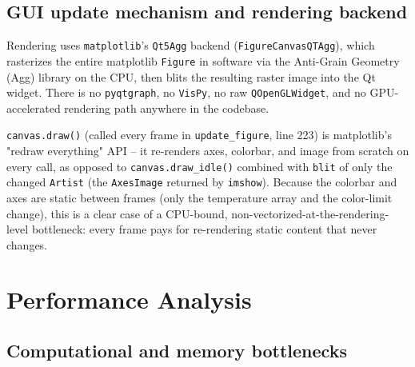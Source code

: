 \documentclass[11pt,a4paper]{report}
\begin{document}
\section{GUI update mechanism and rendering backend}

\begin{factbox}
Rendering uses \texttt{matplotlib}'s \texttt{Qt5Agg} backend (\texttt{FigureCanvasQTAgg}), which
rasterizes the entire matplotlib \texttt{Figure} in software via the Anti-Grain Geometry (Agg) library
on the CPU, then blits the resulting raster image into the Qt widget. There is no
\texttt{pyqtgraph}, no \texttt{VisPy}, no raw \texttt{QOpenGLWidget}, and no GPU-accelerated rendering
path anywhere in the codebase.
\end{factbox}

\begin{interpbox}
\texttt{canvas.draw()} (called every frame in \texttt{update\_figure}, line 223) is matplotlib's
"redraw everything" API -- it re-renders axes, colorbar, and image from scratch on every call, as
opposed to \texttt{canvas.draw\_idle()} combined with \texttt{blit} of only the changed \texttt{Artist}
(the \texttt{AxesImage} returned by \texttt{imshow}). Because the colorbar and axes are static between
frames (only the temperature array and the color-limit change), this is a clear case of a CPU-bound,
non-vectorized-at-the-rendering-level bottleneck: every frame pays for re-rendering static content
that never changes.
\end{interpbox}

\chapter{Performance Analysis}
\label{ch:perf}

\section{Computational and memory bottlenecks}
\end{document}
